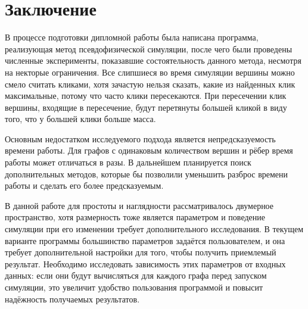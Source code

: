   \clearpage
\section*{Заключение}
  В процессе подготовки дипломной работы была написана программа, реализующая метод псевдофизической симуляции, после чего были проведены численные эксперименты, показавшие состоятельность данного метода, несмотря на некторые ограничения.
  Все слипшиеся во время симуляции вершины можно смело считать кликами, хотя зачастую нельзя сказать, какие из найденных клик максимальные, потому что часто клики пересекаются.
  При пересечении клик вершины, входящие в пересечение, будут перетянуты большей кликой
  в виду того, что у большей клики больше масса.

  Основным недостатком исследуемого подхода является непредсказуемость времени работы.
  Для графов с одинаковым количеством вершин и рёбер время работы может отличаться в разы.
  В дальнейшем планируется поиск дополнительных методов, которые бы позволили уменьшить разброс времени работы и сделать его более предсказуемым.

  В данной работе для простоты и наглядности рассматривалось двумерное пространство, хотя размерность тоже является параметром и поведение симуляции при его изменении требует дополнительного исследования.
  В текущем варианте программы большинство параметров задаётся пользователем, и она требует дополнительной настройки для того, чтобы получить приемлемый результат.
  Необходимо исследовать зависимость этих параметров от входных данных: если они будут вычисляться для каждого графа перед запуском симуляции, это увеличит удобство пользования программой и повысит надёжность получаемых результатов.
